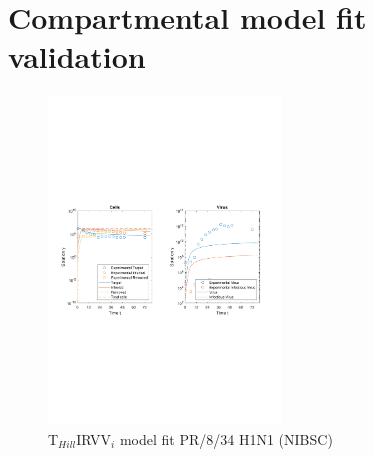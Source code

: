 \section{Compartmental model fit validation}
\label{appendix:compartmentalModelFitValidation}

\begin{figure}[H]
\begin{center}
\includegraphics[width=0.55\textwidth, trim={1cm 9.8cm 1cm 9.5cm}, clip]{D_chapters/6_appendix/4_ValidationNIBSC/InfectionDepletionModelTHillIRVViMOI0.025log.pdf}
\caption[T$_{Hill}$IRVV$_i$ model fit for PR/8/34 H1N1 (NIBSC)]%
{T$_{Hill}$IRVV$_i$ model fit PR/8/34 H1N1 (NIBSC)}
\label{figure:THillIRVViValidationNIBSC}
\end{center}
\end{figure}

